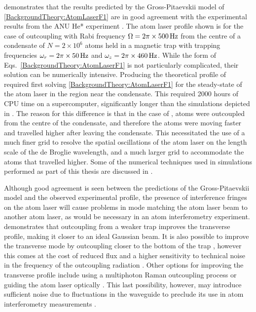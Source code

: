  demonstrates that the results predicted by the Gross-Pitaevskii model of \eqref{BackgroundTheory:AtomLaserF1} are in good agreement with the experimental results from the ANU He* experiment \citep{Dall:2007}.  The atom laser profile shown is for the case of outcoupling with Rabi frequency $\Omega = 2\pi\times \unit[500]{Hz}$ from the centre of a condensate of $N=2 \times 10^6$ atoms held in a magnetic trap with trapping frequencies $\omega_r = 2\pi \times \unit[50]{Hz}$ and $\omega_z = 2 \pi \times \unit[460]{Hz}$.  While the form of Eqs.~\eqref{BackgroundTheory:AtomLaserF1} is not particularly complicated, their solution can be numerically intensive.  Producing the theoretical profile of  required first solving \eqref{BackgroundTheory:AtomLaserF1} for the steady-state of the atom laser in the region near the condensate.  This  required 2000 hours of CPU time on a supercomputer, significantly longer than the simulations depicted in .  The reason for this difference is that in the case of , atoms were outcoupled from the centre of the condensate, and therefore the atoms were moving faster and travelled higher after leaving the condensate.  This necessitated the use of a much finer grid to resolve the spatial oscillations of the atom laser on the length scale of the de Broglie wavelength, and a much larger grid to accommodate the atoms that travelled higher.  Some of the numerical techniques used in simulations performed as part of this thesis are discussed in .

Although good agreement is seen between the predictions of the Gross-Pitaevskii model and the observed experimental profile, the presence of interference fringes on the atom laser will cause problems in mode matching the atom laser beam to another atom laser, as would be necessary in an atom interferometry experiment.   demonstrates that outcoupling from a weaker trap improves the transverse profile, making it closer to an ideal Gaussian beam.  It is also possible to improve the transverse mode by outcoupling closer to the bottom of the trap \citep{Riou:2006fk}, however this comes at the cost of reduced flux and a higher sensitivity to technical noise in the frequency of the outcoupling radiation \citep{Robins:2005uq}.  Other options for improving the transverse profile include using a multiphoton Raman outcoupling process \citep{Hagley:1999dz,Ruostekoski:2003,Jeppesen:2008} or guiding the atom laser optically \citep{Guerin:2006mz,Couvert:2008,Dall:2010}.  This last possibility, however, may introduce sufficient noise due to fluctuations in the waveguide to preclude its use in atom interferometry measurements \citep{Le-Coq:2006}.

